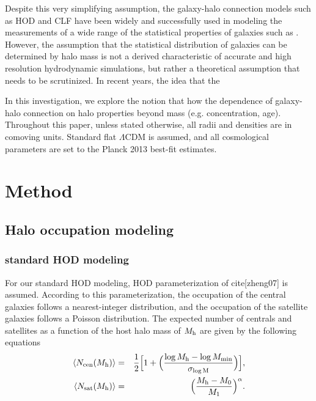 \documentclass[12pt, preprint]{emulateapj}
\begin{document}
Despite this very simplifying assumption, the galaxy-halo connection models such as HOD and CLF
have been widely and successfully used in modeling the measurements of a wide range of the 
statistical properties of galaxies such as . However, the assumption that the statistical 
distribution of galaxies can be determined by halo mass is not a derived characteristic of 
accurate and high resolution hydrodynamic simulations, but rather a theoretical assumption 
that needs to be scrutinized. In recent years, the idea that the   

In this investigation, we explore the notion that how the dependence of 
galaxy-halo connection on halo properties beyond mass (e.g. concentration, age).
Throughout this paper, unless stated otherwise, 
all radii and densities are in comoving units. Standard flat $\Lambda$CDM is assumed, 
and all cosmological parameters are set to the Planck 2013 best-fit estimates.

\section{Method}
\subsection{Halo occupation modeling}
\subsubsection{standard HOD modeling}\label{subsubsec:hod}
For our standard HOD modeling, HOD parameterization of cite[zheng07] is assumed. According to this parameterization, the occupation of the central galaxies follows a nearest-integer distribution, 
and the occupation of the satellite galaxies follows a Poisson distribution. The expected number of centrals and satellites as a function of the host halo mass of $M_{\rm h}$ are given by the following equations 
\begin{eqnarray}
\langle N_{\rm cen}(M_{\rm h}) \rangle &=& \frac{1}{2}\Big[1+\Big(\frac{\log M_{\rm h} - \log M_{\rm min}}{\sigma_{\log \rm{M}}} \Big) \Big], \label{hod:central}\\ 
\langle N_{\rm sat}(M_{\rm h}) \rangle &=& \Big( \frac{M_{\rm h} - M_{\rm{0}}}{M_{\rm 1}} \Big)^{\alpha}. \label{hod:satellite}
\end{eqnarray}
\end{document}
